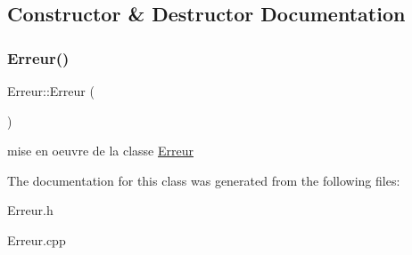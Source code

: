 \subsection{Constructor \& Destructor Documentation}
\mbox{\label{class_erreur_ad79ce22141a8664be066e6e7a5686821}} 
\subsubsection{\texorpdfstring{Erreur()}{Erreur()}}
{\footnotesize\ttfamily Erreur\+::\+Erreur (\begin{DoxyParamCaption}{ }\end{DoxyParamCaption})}

mise en oeuvre de la classe \mbox{\hyperlink{class_erreur}{Erreur}} 

The documentation for this class was generated from the following files\+:\begin{DoxyCompactItemize}
\item 
Erreur.\+h\item 
Erreur.\+cpp\end{DoxyCompactItemize}
